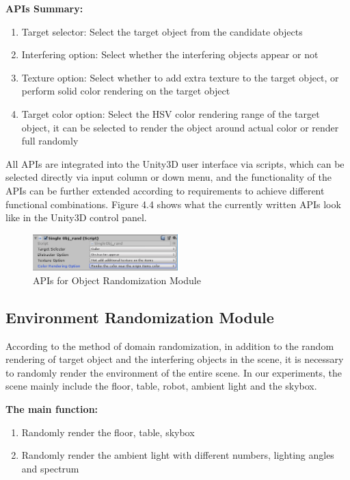 \textbf{APIs Summary:}
\begin{enumerate}
	\item Target selector: Select the target object from the candidate objects
	\item Interfering option: Select whether the interfering objects appear or not
	\item Texture option: Select whether to add extra texture to the target object, or perform solid color rendering on the target object
	\item Target color option: Select the HSV color rendering range of the target object, it can be selected to render the object around actual color or render full randomly
\end{enumerate}
All APIs are integrated into the Unity3D user interface via scripts, which can be selected directly via input column or down menu, and the functionality of the APIs can be further extended according to requirements to achieve different functional combinations. Figure 4.4 shows what the currently written APIs look like in the Unity3D control panel.
\begin{figure}[h]
	\includegraphics[width=0.5\textwidth]{Figures/Section4_ObjrandApi.png} 
	\centering
	\captionsetup{justification=centering}
	\caption{APIs for Object Randomization Module}
	\label{fig:objrandapi}
\end{figure}

\subsection{Environment Randomization Module}
According to the method of domain randomization, in addition to the random rendering of target object and the interfering objects in the scene, it is necessary to randomly render the environment of the entire scene. In our experiments, the scene mainly include the floor, table, robot, ambient light and the skybox.

\textbf{The main function:}
\begin{enumerate}
	\item Randomly render the floor, table, skybox
	\item Randomly render the ambient light with different numbers, lighting angles and spectrum
\end{enumerate}

